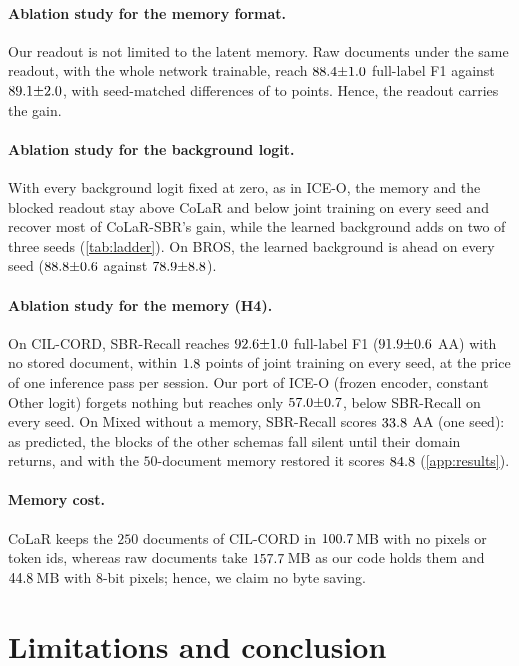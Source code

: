 \documentclass[10pt,twocolumn,letterpaper]{article}
\begin{document}
\paragraph{Ablation study for the memory format.} Our readout is not limited to the latent memory. Raw documents under the same readout, with the whole network trainable, reach $88.4{\pm}1.0$ full-label F1 against $89.1{\pm}2.0$, with seed-matched differences of \nErSbrDiffFullMin{} to \nErSbrDiffFullMax{} points. Hence, the readout carries the gain.

\paragraph{Ablation study for the background logit.} With every background logit fixed at zero, as in ICE-O, the memory and the blocked readout stay above CoLaR and below joint training on every seed and recover most of CoLaR-SBR's gain, while the learned background adds on two of three seeds (\cref{tab:ladder}). On BROS, the learned background is ahead on every seed ($88.8{\pm}0.6$ against $78.9{\pm}8.8$).

\paragraph{Ablation study for the memory (H4).} On CIL-CORD, SBR-Recall reaches $92.6{\pm}1.0$ full-label F1 ($91.9{\pm}0.6$ AA) with no stored document, within $1.8$ points of joint training on every seed, at the price of one inference pass per session. Our port of ICE-O (frozen encoder, constant Other logit) forgets nothing but reaches only $57.0{\pm}0.7$, below SBR-Recall on every seed. On Mixed without a memory, SBR-Recall scores $33.8$ AA (one seed): as predicted, the blocks of the other schemas fall silent until their domain returns, and with the $50$-document memory restored it scores $84.8$ (\cref{app:results}).

\paragraph{Memory cost.}\label{sec:cost} CoLaR keeps the $250$ documents of CIL-CORD in $100.7$\,MB with no pixels or token ids, whereas raw documents take $157.7$\,MB as our code holds them and $44.8$\,MB with 8-bit pixels; hence, we claim no byte saving.
\section{Limitations and conclusion}
\label{sec:limitations}
\label{sec:conclusion}
\end{document}

